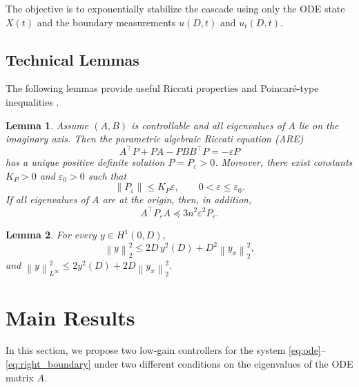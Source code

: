 \documentclass{IEEEtran}
\newcommand{\norm}[1]{\left\lVert #1 \right\rVert}
\newtheorem{lemma}{Lemma}[section]
\theoremstyle{definition}
\begin{document}
The objective is to exponentially stabilize the cascade using only the
ODE state $X(t)$ and the boundary measurements $u(D,t)$ and $u_t(D,t)$.

\subsection{Technical Lemmas}

The following lemmas provide useful Riccati properties
\cite{lin_low-gain_1999,zhou_analytical_2009,xu_stabilization_2018,xu_semi-global_2019}
and Poincar\'e-type inequalities
\cite{krstic_smyshlyaev_boundary_2008,evans_pde_2010}.

\begin{lemma}
\label{lem:riccati}
Assume $(A,B)$ is controllable and all eigenvalues of $A$ lie on the imaginary
axis. Then the parametric algebraic Riccati equation (ARE)
\begin{equation}
A^{\top}P + PA-PBB^{\top}P = -\varepsilon P
\label{eq:are}
\end{equation}
has a unique positive definite solution $P=P_\varepsilon>0$. Moreover, there
exist constants $K_P>0$ and $\varepsilon_0>0$ such that
\begin{equation}
\|P_\varepsilon\|\leq K_P\varepsilon,
\qquad
0<\varepsilon\leq\varepsilon_0.
\label{eq:Pgain}
\end{equation}
If all eigenvalues of $A$ are at the origin, then, in addition,
\begin{equation}
A^{\top}P_\varepsilon A
\preceq 3n^2\varepsilon^2 P_\varepsilon.
\label{eq:riccati_nilp}
\end{equation}
\end{lemma}

\begin{lemma}
\label{lem:poincare}
For every $y\in H^1(0,D)$,
\begin{equation}
\norm{y}_2^2
\leq 2D\,y^2(D)+D^2\norm{y_x}_2^2,
\label{eq:poincare}
\end{equation}
and
$\norm{y}_{L^\infty}^2
\leq 2y^2(D)+2D\norm{y_x}_2^2$.
\end{lemma}



\section{Main Results}
\label{sec:stab}

In this section, we propose two low-gain controllers for the system
\eqref{eq:ode}--\eqref{eq:right_boundary} under two different conditions
on the eigenvalues of the ODE matrix $A$.
\end{document}
